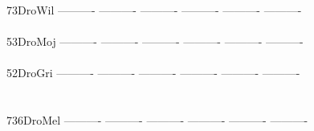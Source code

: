 \documentclass[11pt,twoside,reqno,a4paper]{article}
\begin{document}
{73\hspace*{3\charwidth}DroWil	----------	----------	----------	----------	----------	----------	\\
\hspace*{5\charwidth}\hspace*{7\charwidth}\hspace*{1\charwidth}\hspace*{1\charwidth}\hspace*{1\charwidth}\hspace*{1\charwidth}\hspace*{1\charwidth}\hspace*{1\charwidth}\\
53\hspace*{3\charwidth}DroMoj	----------	----------	----------	----------	----------	----------	\\
\hspace*{5\charwidth}\hspace*{7\charwidth}\hspace*{1\charwidth}\hspace*{1\charwidth}\hspace*{1\charwidth}\hspace*{1\charwidth}\hspace*{1\charwidth}\hspace*{1\charwidth}\\
52\hspace*{3\charwidth}DroGri	----------	----------	----------	----------	----------	----------	\\
\hspace*{5\charwidth}\hspace*{7\charwidth}\hspace*{1\charwidth}\hspace*{1\charwidth}\hspace*{1\charwidth}\hspace*{1\charwidth}\hspace*{1\charwidth}\hspace*{1\charwidth}\\
\\
736\hspace*{2\charwidth}DroMel	----------	----------	----------	----------	----------	----------	\\
\hspace*{5\charwidth}\hspace*{7\charwidth}\hspace*{1\charwidth}\hspace*{1\charwidth}\hspace*{1\charwidth}\hspace*{1\charwidth}\hspace*{1\charwidth}\hspace*{1\charwidth}\\
}
\end{document}

